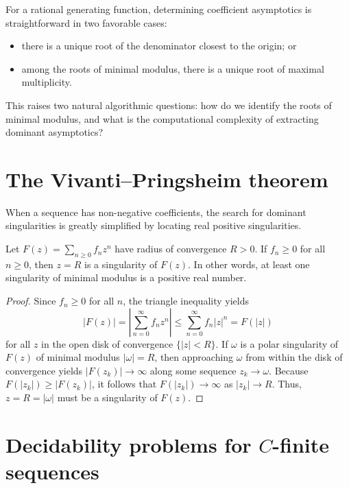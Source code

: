
For a rational generating function, determining coefficient asymptotics is straightforward in two favorable cases:
\begin{itemize}
    \item there is a unique root of the denominator closest to the origin; or
    \item among the roots of minimal modulus, there is a unique root of maximal multiplicity.
\end{itemize}
This raises two natural algorithmic questions: how do we identify the roots of minimal modulus, and what is the computational complexity of extracting dominant asymptotics?


\section*{The Vivanti--Pringsheim theorem}

When a sequence has non-negative coefficients, the search for dominant singularities is greatly simplified by locating real positive singularities.

\begin{theorem}
    \label{thm:vivanti-pringsheim}
    Let \(F(z) = \sum_{n \ge 0} f_n z^n\) have radius of convergence \(R > 0\).
    If \(f_n \ge 0\) for all \(n \ge 0\), then \(z = R\) is a singularity of \(F(z)\).
    In other words, at least one singularity of minimal modulus is a positive real number.
\end{theorem}

\begin{proof}
    Since \(f_n \ge 0\) for all \(n\), the triangle inequality yields
    \[
        |F(z)| = \left| \sum_{n=0}^{\infty} f_n z^n \right| \le \sum_{n=0}^{\infty} f_n |z|^n = F(|z|)
    \]
    for all \(z\) in the open disk of convergence \(\{|z| < R\}\).
    If \(\omega\) is a polar singularity of \(F(z)\) of minimal modulus \(|\omega| = R\), then approaching \(\omega\) from within the disk of convergence yields \(|F(z_k)| \to \infty\) along some sequence \(z_k \to \omega\).
    Because \(F(|z_k|) \ge |F(z_k)|\), it follows that \(F(|z_k|) \to \infty\) as \(|z_k| \to R\).
    Thus, \(z = R = |\omega|\) must be a singularity of \(F(z)\).
\end{proof}


\section*{Decidability problems for \(C\)-finite sequences}

